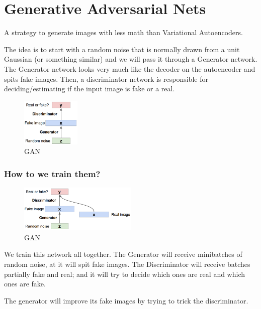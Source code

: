 \chapter{Generative Adversarial Nets}
A strategy to generate images with less math than Variational Autoencoders.

The idea is to start with a random noise that is normally drawn from a unit Gaussian (or something similar) and we will pass it through a Generator network. The Generator network looks very much like the decoder on the autoencoder and spits fake images. Then, a discriminator network is responsible for deciding/estimating if the input image is fake or a real.

\begin{figure}[!htb]
  \centering
  \includegraphics[width=0.25\textwidth]{Images/gans/8.png}
  \caption{GAN}
\end{figure}

\subsection*{How to we train them?}
\begin{figure}[!htb]
  \centering
  \includegraphics[width=0.5\textwidth]{Images/gans/7.png}
  \caption{GAN}
\end{figure}
We train this network all together. The Generator will receive minibatches of random noise, at it will spit fake images. The Discriminator will receive batches partially fake and real; and it will try to decide which ones are real and which ones are fake.

The generator will improve its fake images by trying to trick the discriminator.



